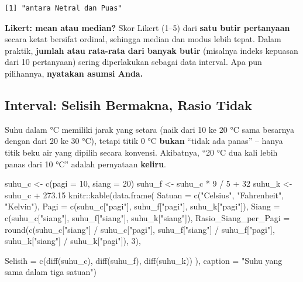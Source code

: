 \documentclass[
  indonesian,
  letterpaper,
]{book}
\newenvironment{Shaded}{\begin{snugshade}}{\end{snugshade}}
\newcommand{\AttributeTok}[1]{\textcolor[rgb]{0.40,0.45,0.13}{#1}}
\newcommand{\DecValTok}[1]{\textcolor[rgb]{0.68,0.00,0.00}{#1}}
\newcommand{\FloatTok}[1]{\textcolor[rgb]{0.68,0.00,0.00}{#1}}
\newcommand{\FunctionTok}[1]{\textcolor[rgb]{0.28,0.35,0.67}{#1}}
\newcommand{\NormalTok}[1]{\textcolor[rgb]{0.00,0.23,0.31}{#1}}
\newcommand{\OtherTok}[1]{\textcolor[rgb]{0.00,0.23,0.31}{#1}}
\newcommand{\SpecialCharTok}[1]{\textcolor[rgb]{0.37,0.37,0.37}{#1}}
\newcommand{\StringTok}[1]{\textcolor[rgb]{0.13,0.47,0.30}{#1}}
\begin{document}
\begin{verbatim}
[1] "antara Netral dan Puas"
\end{verbatim}

\textbf{Likert: mean atau median?} Skor Likert (1--5) dari \textbf{satu
butir pertanyaan} secara ketat bersifat ordinal, sehingga median dan
modus lebih tepat. Dalam praktik, \textbf{jumlah atau rata-rata dari
banyak butir} (misalnya indeks kepuasan dari 10 pertanyaan) sering
diperlakukan sebagai data interval. Apa pun pilihannya, \textbf{nyatakan
asumsi Anda.}

\subsection{Interval: Selisih Bermakna, Rasio
Tidak}\label{interval-selisih-bermakna-rasio-tidak}

Suhu dalam °C memiliki jarak yang setara (naik dari 10 ke 20 °C sama
besarnya dengan dari 20 ke 30 °C), tetapi titik 0 °C \textbf{bukan}
``tidak ada panas'' -- hanya titik beku air yang dipilih secara
konvensi. Akibatnya, ``20 °C dua kali lebih panas dari 10 °C'' adalah
pernyataan \textbf{keliru}.

\begin{Shaded}
\begin{Highlighting}[]
\NormalTok{suhu\_c }\OtherTok{\textless{}{-}} \FunctionTok{c}\NormalTok{(}\AttributeTok{pagi =} \DecValTok{10}\NormalTok{, }\AttributeTok{siang =} \DecValTok{20}\NormalTok{)}
\NormalTok{suhu\_f }\OtherTok{\textless{}{-}}\NormalTok{ suhu\_c }\SpecialCharTok{*} \DecValTok{9} \SpecialCharTok{/} \DecValTok{5} \SpecialCharTok{+} \DecValTok{32}
\NormalTok{suhu\_k }\OtherTok{\textless{}{-}}\NormalTok{ suhu\_c }\SpecialCharTok{+} \FloatTok{273.15}
\NormalTok{knitr}\SpecialCharTok{::}\FunctionTok{kable}\NormalTok{(}\FunctionTok{data.frame}\NormalTok{(}
\AttributeTok{Satuan =} \FunctionTok{c}\NormalTok{(}\StringTok{"Celsius"}\NormalTok{, }\StringTok{"Fahrenheit"}\NormalTok{, }\StringTok{"Kelvin"}\NormalTok{),}
\AttributeTok{Pagi =} \FunctionTok{c}\NormalTok{(suhu\_c[}\StringTok{"pagi"}\NormalTok{], suhu\_f[}\StringTok{"pagi"}\NormalTok{], suhu\_k[}\StringTok{"pagi"}\NormalTok{]),}
\AttributeTok{Siang =} \FunctionTok{c}\NormalTok{(suhu\_c[}\StringTok{"siang"}\NormalTok{], suhu\_f[}\StringTok{"siang"}\NormalTok{], suhu\_k[}\StringTok{"siang"}\NormalTok{]),}
\AttributeTok{Rasio\_Siang\_per\_Pagi =} \FunctionTok{round}\NormalTok{(}\FunctionTok{c}\NormalTok{(suhu\_c[}\StringTok{"siang"}\NormalTok{] }\SpecialCharTok{/}\NormalTok{ suhu\_c[}\StringTok{"pagi"}\NormalTok{],}
\NormalTok{suhu\_f[}\StringTok{"siang"}\NormalTok{] }\SpecialCharTok{/}\NormalTok{ suhu\_f[}\StringTok{"pagi"}\NormalTok{],}
\NormalTok{suhu\_k[}\StringTok{"siang"}\NormalTok{] }\SpecialCharTok{/}\NormalTok{ suhu\_k[}\StringTok{"pagi"}\NormalTok{]), }\DecValTok{3}\NormalTok{),}

\AttributeTok{Selisih =} \FunctionTok{c}\NormalTok{(}\FunctionTok{diff}\NormalTok{(suhu\_c), }\FunctionTok{diff}\NormalTok{(suhu\_f), }\FunctionTok{diff}\NormalTok{(suhu\_k))}
\NormalTok{), }\AttributeTok{caption =} \StringTok{"Suhu yang sama dalam tiga satuan"}\NormalTok{)}
\end{Highlighting}
\end{Shaded}
\end{document}
